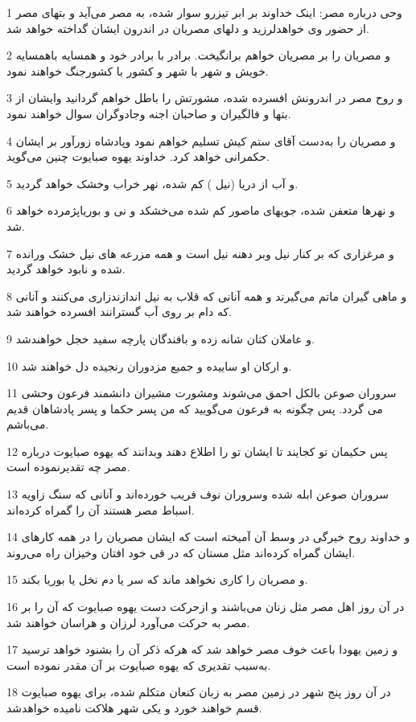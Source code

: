\par 1 وحی درباره مصر: اینک خداوند بر ابر تیزرو سوار شده، به مصر می‌آید و بتهای مصر از حضور وی خواهدلرزید و دلهای مصریان در اندرون ایشان گداخته خواهد شد.
\par 2 و مصریان را بر مصریان خواهم برانگیخت. برادر با برادر خود و همسایه باهمسایه خویش و شهر با شهر و کشور با کشورجنگ خواهند نمود.
\par 3 و روح مصر در اندرونش افسرده شده، مشورتش را باطل خواهم گردانید وایشان از بتها و فالگیران و صاحبان اجنه وجادوگران سوال خواهند نمود.
\par 4 و مصریان را به‌دست آقای ستم کیش تسلیم خواهم نمود وپادشاه زورآور بر ایشان حکمرانی خواهد کرد. خداوند یهوه صبایوت چنین می‌گوید.
\par 5 و آب از دریا (نیل ) کم شده، نهر خراب وخشک خواهد گردید.
\par 6 و نهرها متعفن شده، جویهای ماصور کم شده می‌خشکد و نی و بوریاپژمرده خواهد شد.
\par 7 و مرغزاری که بر کنار نیل وبر دهنه نیل است و همه مزرعه های نیل خشک ورانده شده و نابود خواهد گردید.
\par 8 و ماهی گیران ماتم می‌گیرند و همه آنانی که قلاب به نیل اندازندزاری می‌کنند و آنانی که دام بر روی آب گسترانند افسرده خواهند شد.
\par 9 و عاملان کتان شانه زده و بافندگان پارچه سفید خجل خواهندشد.
\par 10 و ارکان او ساییده و جمیع مزدوران رنجیده دل خواهند شد.
\par 11 سروران صوعن بالکل احمق می‌شوند ومشورت مشیران دانشمند فرعون وحشی می گردد. پس چگونه به فرعون می‌گویید که من پسر حکما و پسر پادشاهان قدیم می‌باشم.
\par 12 پس حکیمان تو کجایند تا ایشان تو را اطلاع دهند وبدانند که یهوه صبایوت درباره مصر چه تقدیرنموده است.
\par 13 سروران صوعن ابله شده وسروران نوف فریب خورده‌اند و آنانی که سنگ زاویه اسباط مصر هستند آن را گمراه کرده‌اند.
\par 14 و خداوند روح خیرگی در وسط آن آمیخته است که ایشان مصریان را در همه کارهای ایشان گمراه کرده‌اند مثل مستان که در قی خود افتان وخیزان راه می‌روند.
\par 15 و مصریان را کاری نخواهد ماند که سر یا دم نخل یا بوریا بکند.
\par 16 در آن روز اهل مصر مثل زنان می‌باشند و ازحرکت دست یهوه صبایوت که آن را بر مصر به حرکت می‌آورد لرزان و هراسان خواهند شد.
\par 17 و زمین یهودا باعث خوف مصر خواهد شد که هرکه ذکر آن را بشنود خواهد ترسید به‌سبب تقدیری که یهوه صبایوت بر آن مقدر نموده است.
\par 18 در آن روز پنج شهر در زمین مصر به زبان کنعان متکلم شده، برای یهوه صبایوت قسم خواهند خورد و یکی شهر هلاکت نامیده خواهدشد.

